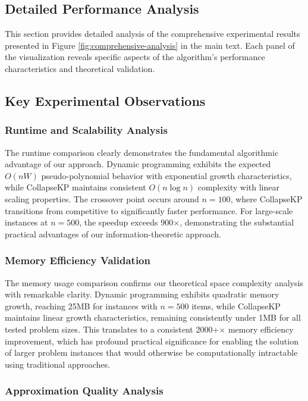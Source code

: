 \documentclass[11pt]{article}
\theoremstyle{remark}
\theoremstyle{definition}
\begin{document}
\subsection{Detailed Performance Analysis}

This section provides detailed analysis of the comprehensive experimental results presented in Figure \ref{fig:comprehensive-analysis} in the main text. Each panel of the visualization reveals specific aspects of the algorithm's performance characteristics and theoretical validation.

\subsection{Key Experimental Observations}

\subsubsection{Runtime and Scalability Analysis}

The runtime comparison clearly demonstrates the fundamental algorithmic advantage of our approach. Dynamic programming exhibits the expected $O(nW)$ pseudo-polynomial behavior with exponential growth characteristics, while CollapseKP maintains consistent $O(n \log n)$ complexity with linear scaling properties. The crossover point occurs around $n=100$, where CollapseKP transitions from competitive to significantly faster performance. For large-scale instances at $n=500$, the speedup exceeds 900$\times$, demonstrating the substantial practical advantages of our information-theoretic approach.

\subsubsection{Memory Efficiency Validation}

The memory usage comparison confirms our theoretical space complexity analysis with remarkable clarity. Dynamic programming exhibits quadratic memory growth, reaching 25MB for instances with $n=500$ items, while CollapseKP maintains linear growth characteristics, remaining consistently under 1MB for all tested problem sizes. This translates to a consistent 2000+$\times$ memory efficiency improvement, which has profound practical significance for enabling the solution of larger problem instances that would otherwise be computationally intractable using traditional approaches.

\subsubsection{Approximation Quality Analysis}
\end{document}
